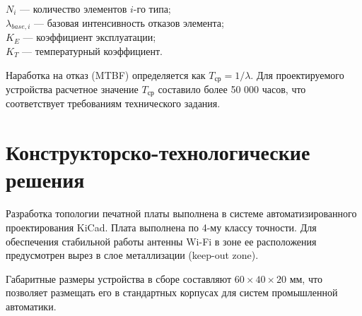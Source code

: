 \begin{formula_where}
    $N_i$ --- количество элементов $i$-го типа; \\
    $\lambda_{base, i}$ --- базовая интенсивность отказов элемента; \\
    $K_E$ --- коэффициент эксплуатации; \\
    $K_T$ --- температурный коэффициент.
\end{formula_where}

Наработка на отказ (MTBF) определяется как $T_{ср} = 1 / \lambda$. Для проектируемого устройства расчетное значение $T_{ср}$ составило более 50 000 часов, что соответствует требованиям технического задания.

\section{Конструкторско-технологические решения}

Разработка топологии печатной платы выполнена в системе автоматизированного проектирования KiCad. Плата выполнена по 4-му классу точности. Для обеспечения стабильной работы антенны Wi-Fi в зоне ее расположения предусмотрен вырез в слое металлизации (keep-out zone).



Габаритные размеры устройства в сборе составляют $60 \times 40 \times 20$ мм, что позволяет размещать его в стандартных корпусах для систем промышленной автоматики.

\newpage